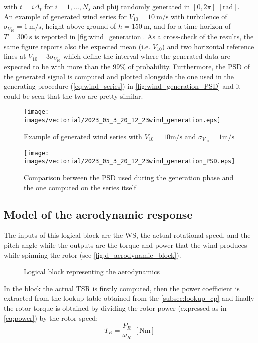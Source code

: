 with $t = i\Delta_t$ for $i=1,\dots,N_s$ and \acrshort{phij} randomly generated in $ \left[0, 2\pi\right]$ $\left[\si{\radian}\right]$. \\
An example of generated wind series for $V_{10}=10 \ \si{\meter\per\second}$ with turbulence of $\sigma_{V_{10}}=1 \ \si{\meter\per\second}$, height above ground of $h=150 
 \ \si{\meter}$, and for a time horizon of $T = 300 \ \si{\second}$ is reported in \autoref{fig:wind_generation}. As a cross-check of the results, the same figure reports also the expected mean (i.e. $V_{10}$) and two horizontal reference lines at $V_{10}\pm3\sigma_{V_{10}}$ which define the interval where the generated data are expected to be with more than the 99\% of probability. Furthermore, the PSD of the generated signal is computed and plotted alongside the one used in the generating procedure (\autoref{eq:wind_series}) in \autoref{fig:wind_generation_PSD} and it could be seen that the two are pretty similar. 
\begin{figure}[htb]
    \centering
    \texttt{[image: images/vectorial/2023\_05\_3\_20\_12\_23wind\_generation.eps]}
    \caption{Example of generated wind series with $V_{10}=10\si{\meter\per\second}$ and $\sigma_{V_{10}}=1\si{\meter\per\second}$ }
    \label{fig:wind_generation}
\end{figure}

\begin{figure}[htb]
    \centering
    \texttt{[image: images/vectorial/2023\_05\_3\_20\_12\_23wind\_generation\_PSD.eps]}
    \caption{Comparison between the PSD used during the generation phase and the one computed on the series itself}
    \label{fig:wind_generation_PSD}
\end{figure}

\subsection[Aerodynamic]{Model of the aerodynamic response}
The inputs of this logical block are the WS, the actual rotational speed, and the pitch angle while the outputs are the torque and power that the wind produces while spinning the rotor (see \autoref{fig:d_aerodynamic_block}). 
\begin{figure}
  \centering
  
  \caption{Logical block representing the aerodynamics}
  \label{fig:d_aerodynamic_block}
\end{figure}

In the block the actual \acrshort{TSR} is firstly computed, then the power coefficient is extracted from the lookup table obtained from the \autoref{subsec:lookup_cp} and finally the rotor torque is obtained by dividing the rotor power (expressed as in \autoref{eq:power}) by the rotor speed:
\begin{equation}
    T_R = \frac{P_R}{\omega_R} \ \ \left[\si{\newton\meter}\right]
\end{equation}

